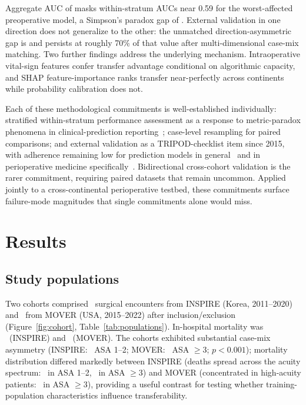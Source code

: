 Aggregate AUC of \pnXgbMovAOnInspireFullAUC{} masks within-stratum AUCs near 0.59 for the worst-affected preoperative model, a Simpson's paradox gap of \pnParadoxGapXgbMovAOnInspireFull{}. External validation in one direction does not generalize to the other: the unmatched direction-asymmetric gap is \pnDirectionAsymmetryDiffPpFull{} and persists at roughly 70\% of that value after multi-dimensional case-mix matching. Two further findings address the underlying mechanism. Intraoperative vital-sign features confer transfer advantage conditional on algorithmic capacity, and SHAP feature-importance ranks transfer near-perfectly across continents while probability calibration does not.

Each of these methodological commitments is well-established individually: stratified within-stratum performance assessment as a response to metric-paradox phenomena in clinical-prediction reporting~\cite{chipman2017simpson}; case-level resampling for paired comparisons; and external validation as a TRIPOD-checklist item since 2015, with adherence remaining low for prediction models in general~\cite{heus2018tripod, andaurnavarro2022ml} and in perioperative medicine specifically~\cite{arina2024probast}. Bidirectional cross-cohort validation is the rarer commitment, requiring paired datasets that remain uncommon. Applied jointly to a cross-continental perioperative testbed, these commitments surface failure-mode magnitudes that single commitments alone would miss.

\section{Results}
\label{sec:results}

\subsection{Study populations}
\label{sec:results:populations}

Two cohorts comprised \pnTableOneNInspire\ surgical encounters from INSPIRE (Korea, 2011--2020) and \pnTableOneNMover\ from MOVER (USA, 2015--2022) after inclusion/exclusion (Figure~\ref{fig:cohort}, Table~\ref{tab:populations}). In-hospital mortality was \pnTableOneMortalityInspire\ (INSPIRE) and \pnTableOneMortalityMover\ (MOVER). The cohorts exhibited substantial case-mix asymmetry (INSPIRE: \pnTableOneAsaOneTwoPctInspire\ ASA 1--2; MOVER: \pnTableOneAsaThreePlusPctMover\ ASA $\geq 3$; $p < 0.001$); mortality distribution differed markedly between INSPIRE (deaths spread across the acuity spectrum: \pnTableOneDeathsAsaOneTwoPctInspire\ in ASA 1--2, \pnTableOneDeathsAsaThreePlusPctInspire\ in ASA $\geq 3$) and MOVER (concentrated in high-acuity patients: \pnTableOneDeathsAsaThreePlusPctMover\ in ASA $\geq 3$), providing a useful contrast for testing whether training-population characteristics influence transferability.

